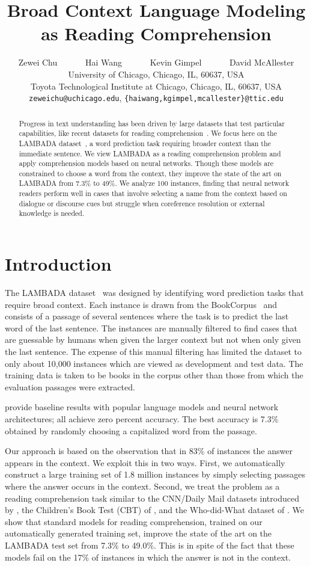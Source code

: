 \documentclass[11pt]{article}
\title{Broad Context Language Modeling as Reading Comprehension}
\author{Zewei Chu \ \ \ \ \ \  Hai Wang \ \ \ \ \ \ Kevin Gimpel \ \ \ \ \ \ David McAllester \\
[1ex]
University of Chicago, Chicago, IL, 60637, USA\\
Toyota Technological Institute at Chicago, Chicago, IL, 60637, USA\\
[1ex]
{\small
{\tt zeweichu@uchicago.edu},  
{\tt \{haiwang,kgimpel,mcallester\}@ttic.edu}
}\\}
\date{}
\begin{document}
\maketitle
\begin{abstract}
Progress in text understanding has been driven by large datasets that test particular capabilities, like recent datasets for reading comprehension~\cite{deepmind-reader:15}. We focus here on the LAMBADA dataset~\cite{lambada:16}, a word prediction task requiring broader context than the immediate sentence. We view LAMBADA as a reading comprehension problem and apply comprehension models based on neural networks. Though these models are constrained to choose a word from the context, they improve the state of the art on LAMBADA from 7.3\% to 49\%. We analyze  100 instances, finding that neural network readers perform well in cases that involve selecting a name from the context based on dialogue or discourse cues but struggle when coreference resolution or external knowledge is needed. 
\end{abstract}

\section{Introduction}

The LAMBADA dataset~\cite{lambada:16} was designed by identifying word prediction tasks that require broad context.  Each  instance is drawn from the BookCorpus~\cite{zhu:15} and consists of a passage of several sentences where the task is to predict the last word of the last sentence.  
The instances are manually filtered to find cases that are guessable by humans when given the larger context but not when only given the last sentence.  The expense of this manual filtering has limited the dataset to only about 10,000 instances which are viewed as development and test data.  The training data is taken to be books in the corpus other than those from which the evaluation passages were extracted. 

 provide baseline results with popular language models and neural network architectures; all achieve zero percent accuracy. 
The best accuracy is 7.3\% obtained by randomly choosing a capitalized word from the passage.

Our approach is based on the observation that in 83\% of instances the answer appears in the context. We exploit this in two ways.  First, we automatically construct a large training set of 1.8 million instances by simply selecting passages where the answer occurs in the context.  Second, we treat the problem as a reading comprehension task similar to the CNN/Daily Mail datasets introduced by , the Children's Book Test (CBT) of , and the Who-did-What dataset of .  We show that standard models for reading comprehension, trained on our automatically generated training set, improve the state of the art on the LAMBADA test set from 7.3\% to 49.0\%.  This is in spite of the fact that these models fail on the 17\% of instances in which the answer is not in the context. 
\end{document}
